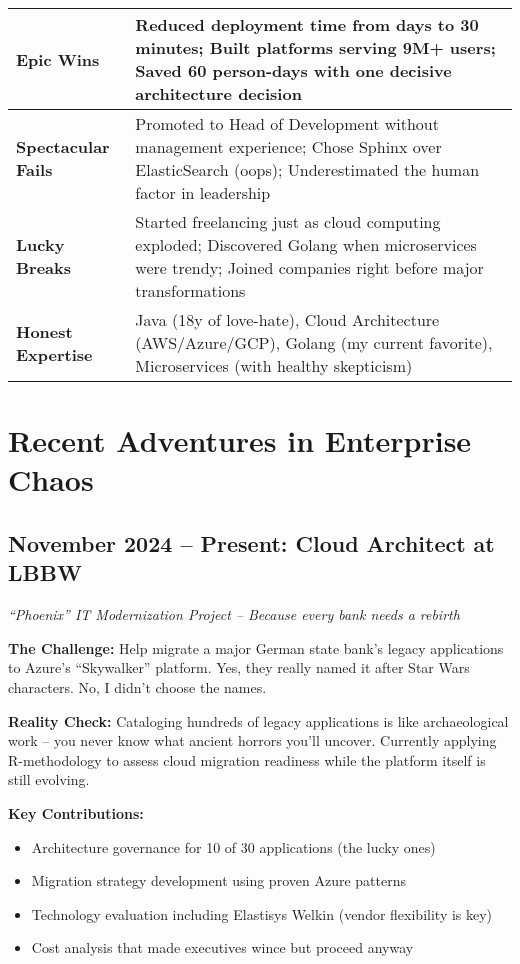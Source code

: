 \documentclass[10pt,a4paper]{article}
\begin{document}
\begin{tabularx}{\textwidth}{|l|X|}
\hline
\textbf{Epic Wins} & Reduced deployment time from days to 30 minutes; Built platforms serving 9M+ users; Saved 60 person-days with one decisive architecture decision \\
\hline
\textbf{Spectacular Fails} & Promoted to Head of Development without management experience; Chose Sphinx over ElasticSearch (oops); Underestimated the human factor in leadership \\
\hline
\textbf{Lucky Breaks} & Started freelancing just as cloud computing exploded; Discovered Golang when microservices were trendy; Joined companies right before major transformations \\
\hline
\textbf{Honest Expertise} & Java (18y of love-hate), Cloud Architecture (AWS/Azure/GCP), Golang (my current favorite), Microservices (with healthy skepticism) \\
\hline
\end{tabularx}

\section{Recent Adventures in Enterprise Chaos}

\subsection{November 2024 -- Present: Cloud Architect at LBBW}
\textit{``Phoenix'' IT Modernization Project -- Because every bank needs a rebirth}

\textbf{The Challenge:} Help migrate a major German state bank's legacy applications to Azure's ``Skywalker'' platform. Yes, they really named it after Star Wars characters. No, I didn't choose the names.

\textbf{Reality Check:} Cataloging hundreds of legacy applications is like archaeological work -- you never know what ancient horrors you'll uncover. Currently applying R-methodology to assess cloud migration readiness while the platform itself is still evolving.

\textbf{Key Contributions:}
\begin{itemize}
    \item Architecture governance for 10 of 30 applications (the lucky ones)
    \item Migration strategy development using proven Azure patterns
    \item Technology evaluation including Elastisys Welkin (vendor flexibility is key)
    \item Cost analysis that made executives wince but proceed anyway
\end{itemize}
\end{document}
